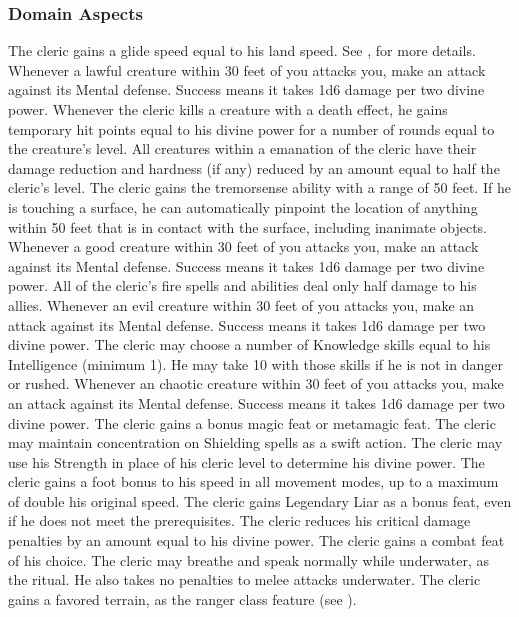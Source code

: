 \subsubsection{Domain Aspects}\label{Domain Aspects}

The cleric gains a glide speed equal to his land speed.
See , for more details.
Whenever a lawful creature within 30 feet of you attacks you, make an attack against its Mental defense.
Success means it takes 1d6 damage per two divine power.
Whenever the cleric kills a creature with a death effect, he gains temporary hit points equal to his divine power for a number of rounds equal to the creature's level.
All creatures within a \areamed emanation of the cleric have their damage reduction and hardness (if any) reduced by an amount equal to half the cleric's level.
The cleric gains the tremorsense ability with a range of 50 feet.
If he is touching a surface, he can automatically pinpoint the location of anything within 50 feet that is in contact with the surface, including inanimate objects.
Whenever a good creature within 30 feet of you attacks you, make an attack against its Mental defense.
Success means it takes 1d6 damage per two divine power.
All of the cleric's fire spells and abilities deal only half damage to his allies.
Whenever an evil creature within 30 feet of you attacks you, make an attack against its Mental defense.
Success means it takes 1d6 damage per two divine power.
The cleric may choose a number of Knowledge skills equal to his Intelligence (minimum 1).
He may take 10 with those skills if he is not in danger or rushed.
Whenever an chaotic creature within 30 feet of you attacks you, make an attack against its Mental defense.
Success means it takes 1d6 damage per two divine power.
The cleric gains a bonus magic feat or metamagic feat.
The cleric may maintain concentration on Shielding spells as a swift action.
The cleric may use his Strength in place of his cleric level to determine his divine power.
The cleric gains a  foot bonus to his speed in all movement modes, up to a maximum of double his original speed.
The cleric gains Legendary Liar as a bonus feat, even if he does not meet the prerequisites.
The cleric reduces his critical damage penalties by an amount equal to his divine power.
The cleric gains a combat feat of his choice.
 The cleric may breathe and speak normally while underwater, as the 
ritual.
He also takes no penalties to melee attacks underwater.
The cleric gains a favored terrain, as the ranger class feature (see ).

